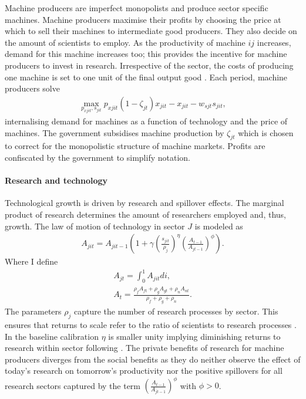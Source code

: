 Machine producers are imperfect monopolists and produce sector specific machines. Machine producers maximise their profits by choosing the price at which to sell their machines to intermediate good producers. They also decide on the amount of scientists to employ. As the productivity of machine $ij$ increases, demand for this machine increases too; this provides the incentive for machine producers to invest in research. Irrespective of the sector, the costs of producing one machine is set to one unit of the final output good \citep[similar to][]{Fried2018ClimateAnalysis, Acemoglu2012TheChange}.
Each period, machine producers solve
\begin{align}
\underset{p_{xjit}, s_{jit}}{\max}p_{xjit}(1-\zeta_{jt})x_{jit}-x_{jit}-w_{sjt}s_{jit},
\end{align}
internalising demand for machines as a function of technology and the price of machines. 
The government subsidises machine production by $\zeta_{jt}$ which is chosen to correct for the monopolistic structure of machine markets. Profits are confiscated by the government to simplify notation.

\paragraph{Research and technology}
Technological growth is driven by research and spillover effects. The marginal product of research determines the amount of researchers employed and, thus, growth. 
The law of motion of technology in sector $J$ is modeled as
\begin{align}
A_{jit}=A_{jit-1}\left(1+\gamma\left(\frac{s_{jit}}{\rho_j}\right)^\eta\left(\frac{A_{t-1}}{A_{jt-1}}\right)^\phi\right).
\end{align}
Where I define
\begin{align}
A_{jt}=\int_{0}^{1}A_{jit}di,\\
A_{t}=\frac{\rho_fA_{ft}+\rho_gA_{gt}+\rho_n A_{nt}}{\rho_f+\rho_g+\rho_n}.
\end{align}
The parameters $\rho_j$ capture the number of research processes by sector. This ensures that returns to scale refer to the ratio of scientists to research processes \citep{Fried2018ClimateAnalysis}. In the baseline calibration $\eta$ is smaller unity implying diminishing returns to research within sector following \cite{Fried2018ClimateAnalysis}. 
The private benefits of research for machine producers diverges from the social benefits as they do neither observe the effect of today's research on tomorrow's productivity nor the positive spillovers for all research sectors captured by the term $\left(\frac{A_{t-1}}{A_{jt-1}}\right)^\phi$ with $\phi>0$. 

